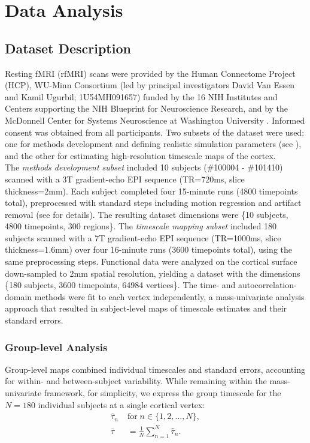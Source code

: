 \documentclass[docs/main.tex]{subfiles}
\begin{document}
\section{Data Analysis}

\subsection{Dataset Description}\label{sec:dataset-description}

Resting fMRI (rfMRI) scans were provided by the Human Connectome Project (HCP), WU-Minn Consortium (led by principal investigators David Van Essen and Kamil Ugurbil; 1U54MH091657) funded by the 16 NIH Institutes and Centers supporting the NIH Blueprint for Neuroscience Research, and by the McDonnell Center for Systems Neuroscience at Washington University \citep{van_essen_wu-minn_2013}. Informed consent was obtained from all participants. Two subsets of the dataset were used: one for methods development and defining realistic simulation parameters (see ), and the other for estimating high-resolution timescale maps of the cortex.\\

The \textit{methods development subset} included 10 subjects  (\#100004 - \#101410) scanned with a 3T gradient-echo EPI sequence (TR=720ms, slice thickness=2mm). Each subject completed four 15-minute runs (4800 timepoints total), preprocessed with standard steps including motion regression and artifact removal (see \citet{glasser_minimal_2013} for details). The resulting dataset dimensions were \{10 subjects, 4800 timepoints, 300 regions\}. The \textit{timescale mapping subset} included 180 subjects scanned with a 7T gradient-echo EPI sequence (TR=1000ms, slice thickness=1.6mm) over four 16-minute runs (3600 timepoints total), using the same preprocessing steps. Functional data were analyzed on the cortical surface down-sampled to 2mm spatial resolution, yielding a dataset with the dimensions \{180 subjects, 3600 timepoints, 64984 vertices\}. The time- and autocorrelation-domain methods were fit to each vertex independently, a mass-univariate analysis approach that resulted in subject-level maps of timescale estimates and their standard errors.\\

\subsubsection{Group-level Analysis}\label{sec:group-level-analysis}
Group-level maps combined individual timescales and standard errors, accounting for within- and between-subject variability. While remaining within the mass-univariate framework, for simplicity, we express the group timescale for the $N=180$ individual subjects at a single cortical vertex:
\begin{align}
    \hat\tau_n \; &\text{for} \; n\in\{1, 2, ..., N\},\\
    \bar\tau &= \frac{1}{N} \sum_{n=1}^N \hat\tau_n.
\end{align}
\end{document}
